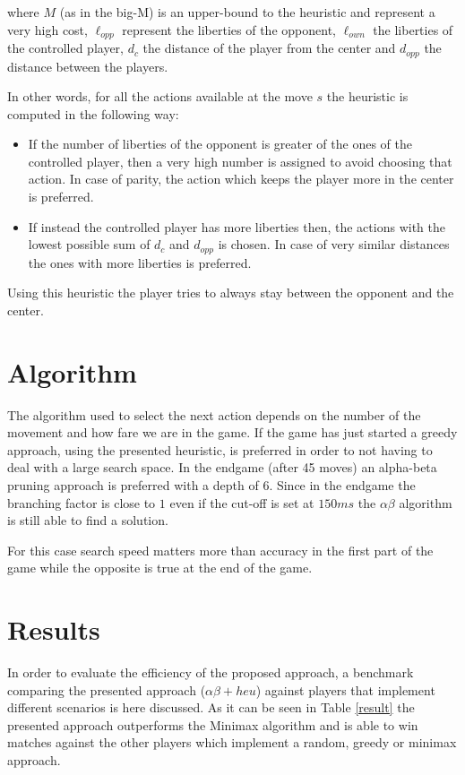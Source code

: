 \documentclass[11pt]{scrartcl}
\begin{document}
where $M$ (as in the big-M) is an upper-bound to the heuristic and represent a very high cost, $\ell_{opp}$ represent the liberties of the opponent, $\ell_{own}$ the liberties of the controlled player, $d_c$ the distance of the player from the center and $d_{opp}$ the distance between the players.

In other words, for all the actions available at the move $s$ the heuristic is computed in the following way:
\begin{itemize}
	\item If the number of liberties of the opponent is greater of the ones of the controlled player, then a very high number is assigned to avoid choosing that action. In case of parity, the action which keeps the player more in the center is preferred.
	\item If instead the controlled player has more liberties then, the actions with the lowest possible sum of $d_c$ and $d_{opp}$ is chosen. In case of very similar distances the ones with more liberties is preferred.
\end{itemize}
Using this heuristic the player tries to always stay between the opponent and the center.

\section{Algorithm}
The algorithm used to select the next action depends on the number of the movement and how fare we are in the game. If the game has just started a greedy approach, using the presented heuristic, is preferred in order to not having to deal with a large search space. In the endgame (after 45 moves) an alpha-beta pruning approach is preferred with a depth of $6$. Since in the endgame the branching factor is close to $1$ even if the cut-off is set at $150ms$ the $\alpha\beta$ algorithm is still able to find a solution. 

For this case search speed matters more than accuracy in the first part of the game while the opposite is true at the end of the game.

\section{Results}
In order to evaluate the efficiency of the proposed approach, a benchmark comparing the presented approach ($\alpha\beta + heu$) against players that implement different scenarios is here discussed. As it can be seen in Table \ref{result} the presented approach outperforms the Minimax algorithm and is able to win matches against the other players which implement a random, greedy or minimax approach.
\end{document}
